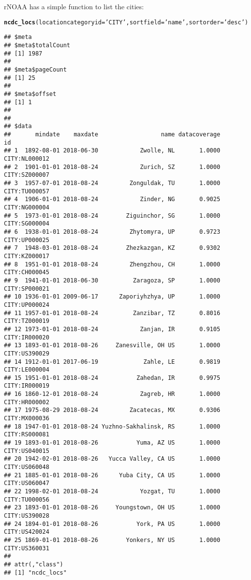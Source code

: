 \documentclass{article}\usepackage[]{graphicx}\usepackage[]{color}
\makeatletter
\newcommand{\hlstr}[1]{\textcolor[rgb]{0.192,0.494,0.8}{#1}}%
\newcommand{\hlstd}[1]{\textcolor[rgb]{0.345,0.345,0.345}{#1}}%
\newcommand{\hlkwc}[1]{\textcolor[rgb]{0.333,0.667,0.333}{#1}}%
\newcommand{\hlkwd}[1]{\textcolor[rgb]{0.737,0.353,0.396}{\textbf{#1}}}%
\newenvironment{kframe}{%
 \def\at@end@of@kframe{}%
 \ifinner\ifhmode%
  \def\at@end@of@kframe{\end{minipage}}%
  \begin{minipage}{\columnwidth}%
 \fi\fi%
 \def\FrameCommand##1{\hskip\@totalleftmargin \hskip-\fboxsep
 \colorbox{shadecolor}{##1}\hskip-\fboxsep
     \hskip-\linewidth \hskip-\@totalleftmargin \hskip\columnwidth}%
 \MakeFramed {\advance\hsize-\width
   \@totalleftmargin\z@ \linewidth\hsize
   \@setminipage}}%
 {\par\unskip\endMakeFramed%
 \at@end@of@kframe}
\newenvironment{knitrout}{}{} %
\makeatother
\begin{document}
rNOAA has a simple function to list the cities:
\begin{knitrout}
\color{fgcolor}\begin{kframe}
\begin{alltt}
\hlkwd{ncdc_locs}\hlstd{(}\hlkwc{locationcategoryid}\hlstd{=}\hlstr{'CITY'}\hlstd{,} \hlkwc{sortfield}\hlstd{=}\hlstr{'name'}\hlstd{,} \hlkwc{sortorder}\hlstd{=}\hlstr{'desc'}\hlstd{)}
\end{alltt}
\begin{verbatim}
## $meta
## $meta$totalCount
## [1] 1987
## 
## $meta$pageCount
## [1] 25
## 
## $meta$offset
## [1] 1
## 
## 
## $data
##       mindate    maxdate                  name datacoverage            id
## 1  1892-08-01 2018-06-30            Zwolle, NL       1.0000 CITY:NL000012
## 2  1901-01-01 2018-08-24            Zurich, SZ       1.0000 CITY:SZ000007
## 3  1957-07-01 2018-08-24         Zonguldak, TU       1.0000 CITY:TU000057
## 4  1906-01-01 2018-08-24            Zinder, NG       0.9025 CITY:NG000004
## 5  1973-01-01 2018-08-24        Ziguinchor, SG       1.0000 CITY:SG000004
## 6  1938-01-01 2018-08-24         Zhytomyra, UP       0.9723 CITY:UP000025
## 7  1948-03-01 2018-08-24        Zhezkazgan, KZ       0.9302 CITY:KZ000017
## 8  1951-01-01 2018-08-24         Zhengzhou, CH       1.0000 CITY:CH000045
## 9  1941-01-01 2018-06-30          Zaragoza, SP       1.0000 CITY:SP000021
## 10 1936-01-01 2009-06-17      Zaporiyhzhya, UP       1.0000 CITY:UP000024
## 11 1957-01-01 2018-08-24          Zanzibar, TZ       0.8016 CITY:TZ000019
## 12 1973-01-01 2018-08-24            Zanjan, IR       0.9105 CITY:IR000020
## 13 1893-01-01 2018-08-26     Zanesville, OH US       1.0000 CITY:US390029
## 14 1912-01-01 2017-06-19             Zahle, LE       0.9819 CITY:LE000004
## 15 1951-01-01 2018-08-24           Zahedan, IR       0.9975 CITY:IR000019
## 16 1860-12-01 2018-08-24            Zagreb, HR       1.0000 CITY:HR000002
## 17 1975-08-29 2018-08-24         Zacatecas, MX       0.9306 CITY:MX000036
## 18 1947-01-01 2018-08-24 Yuzhno-Sakhalinsk, RS       1.0000 CITY:RS000081
## 19 1893-01-01 2018-08-26           Yuma, AZ US       1.0000 CITY:US040015
## 20 1942-02-01 2018-08-26   Yucca Valley, CA US       1.0000 CITY:US060048
## 21 1885-01-01 2018-08-26      Yuba City, CA US       1.0000 CITY:US060047
## 22 1998-02-01 2018-08-24            Yozgat, TU       1.0000 CITY:TU000056
## 23 1893-01-01 2018-08-26     Youngstown, OH US       1.0000 CITY:US390028
## 24 1894-01-01 2018-08-26           York, PA US       1.0000 CITY:US420024
## 25 1869-01-01 2018-08-26        Yonkers, NY US       1.0000 CITY:US360031
## 
## attr(,"class")
## [1] "ncdc_locs"
\end{verbatim}
\end{kframe}
\end{knitrout}
\end{document}
